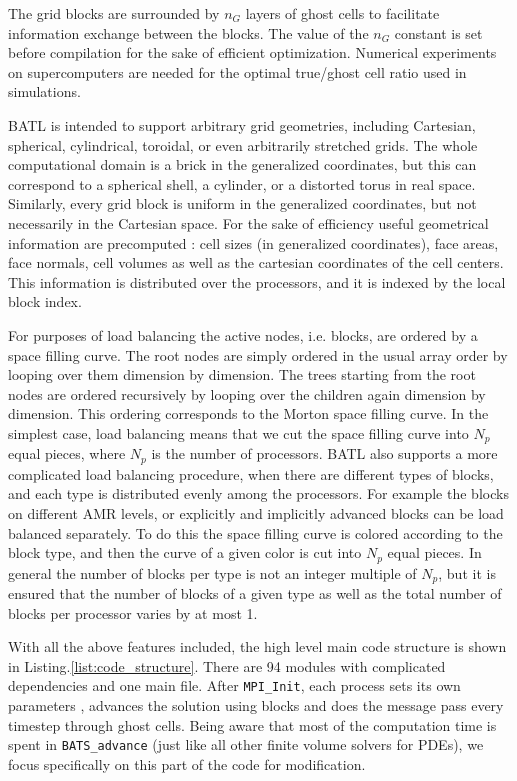 \documentclass[fleqn,11pt]{SelfArx} %
\begin{document}
The grid blocks are surrounded by $n_G$ layers of ghost cells to facilitate information exchange between the blocks. The value of the $n_G$ constant is set before compilation for the sake of efficient optimization. Numerical experiments on supercomputers are needed for the optimal true/ghost cell ratio used in simulations. 

BATL is intended to support arbitrary grid geometries, including Cartesian, spherical, cylindrical, toroidal, or even arbitrarily stretched grids. The whole computational domain is a brick in the generalized coordinates, but this can correspond to a spherical shell, a cylinder, or a distorted torus in real space. Similarly, every grid block is uniform in the generalized coordinates, but not necessarily in the Cartesian space. For the sake of efficiency useful geometrical information are precomputed : cell sizes (in generalized coordinates), face areas, face normals, cell volumes as well as the cartesian coordinates of the cell centers. This information is distributed over the processors, and it is indexed by the local block index.

For purposes of load balancing the active nodes, i.e. blocks, are ordered by a space filling curve. The root nodes are simply ordered in the usual array order by looping over them dimension by dimension. The trees starting from the root nodes are ordered recursively by looping over the children again dimension by dimension. This ordering corresponds to the Morton space filling curve. In the simplest case, load balancing means that we cut the space filling curve into $N_p$ equal pieces, where $N_p$ is the number of processors. BATL also supports a more complicated load balancing procedure, when there are different types of blocks, and each type is distributed evenly among the processors. For example the blocks on different AMR levels, or explicitly and implicitly advanced blocks can be load balanced separately. To do this the space filling curve is colored according to the block type, and then the curve of a given color is cut into $N_p$ equal pieces. In general the number of blocks per type is not an integer multiple of $N_p$, but it is ensured that the number of blocks of a given type as well as the total number of blocks per processor varies by at most 1.

With all the above features included, the high level main code structure is shown in Listing.\ref{list:code_structure}. There are 94 modules with complicated dependencies and one main file. After \verb|MPI_Init|, each process sets its own parameters , advances the solution using blocks and does the message pass every timestep through ghost cells. Being aware that most of the computation time is spent in \verb|BATS_advance| (just like all other finite volume solvers for PDEs), we focus specifically on this part of the code for modification.
\end{document}
